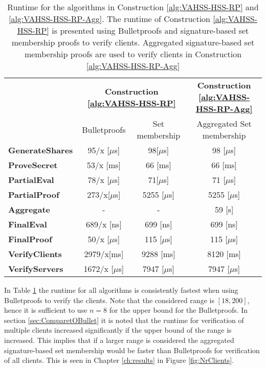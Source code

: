  \begin{table}[h]
\centering
\begin{tabular}{l  c c c}

&   \multicolumn{2}{c}{\textbf{ Construction \ref{alg:VAHSS-HSS-RP}}}    &	\textbf{Construction \ref{alg:VAHSS-HSS-RP-Agg}}	\\ 
    																	& Bulletproofs  & Set membership & Aggregated Set membership\\	\toprule
  \textbf{GenerateShares}				  					&95/x [$\mu$s]			 &98[$\mu$s]  &98 [$\mu$s]												\\ 
  \textbf{ProveSecret} 						&53/x [ms]				& 	66 [ms]	&66 [ms]			\\ 
  \textbf{PartialEval}  										&   78/x	[$\mu$s]				&71[$\mu$s]	 		&	71	 [$\mu$s]							\\ 
  \textbf{PartialProof} 									&   273/x[$\mu$s]						& 5255 [$\mu$s]			& 5255 [$\mu$s]				\\ 
   \textbf{Aggregate}										&   -				&		-	&		59 [s]					\\ 
  \textbf{FinalEval}  											&   689/x [ns]						&699  [ns]				&			699  [ns]												\\ 
  \textbf{FinalProof}  												&   50/x	[$\mu$s]			&  115 [$\mu$s]	&				115 [$\mu$s]									\\ 
  \textbf{VerifyClients}							  							&   2979/x[ms]					& 9288 [ms]&					8120 [ms]							\\ 
  \textbf{VerifyServers}											&   1672/x [$\mu$s]					&		7947 [$\mu$s] 	&		7947 [$\mu$s]					\\ 
  \bottomrule
\end{tabular}
\caption{Runtime for the algorithms in Construction \ref{alg:VAHSS-HSS-RP} and \ref{alg:VAHSS-HSS-RP-Agg}. The runtime of Construction \ref{alg:VAHSS-HSS-RP} is presented using Bulletproofs and signature-based set membership proofs to verify clients.  Aggregated signature-based set membership proofs are used to verify clients in Construction \ref{alg:VAHSS-HSS-RP-Agg}}
\label{tab:BenchBP}
\end{table}

In Table \ref{tab:BenchBP} the runtime for all algorithms  is consistently fastest when using Bulletproofs to verify the clients. Note that the considered range is $[18,200]$, hence it is sufficient to use $n=8$ for the upper bound for the Bulletproofs. In section \ref{sec:ComparetOBullet} it is noted that the runtime for verification of multiple clients increased significantly if the upper bound of the range is increased. This implies that if a larger range is considered the aggregated signature-based set membership would be faster than Bulletproofs for verification of all clients. This is seen in Chapter \ref{ch:results} in Figure \ref{fig:NrClients}. 

